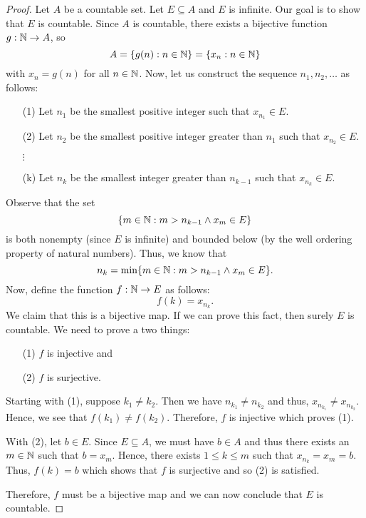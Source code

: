 \documentclass[a4paper]{report}
\begin{document}
\begin{proof}
Let \( A  \) be a countable set. Let \( E \subseteq A  \) and \( E  \) is infinite. Our goal is to show that \( E  \) is countable. Since \( A  \) is countable, there exists a bijective function \( g: \mathbb{N} \to A  \), so 
\[  A = \{ g(n) : n \in \mathbb{N} \} = \{ {x}_{n} : n \in \mathbb{N} \} \]
with \( {x}_{n} = g(n) \) for all \( n \in \mathbb{N} \).
Now, let us construct the sequence \( {n}_{1}, {n}_{2}, \dots  \) as follows: 
\begin{enumerate}
    \item[(1)] Let \( {n}_{1}  \) be the smallest positive integer such that \( {x}_{{n}_{1}} \in E  \). 
    \item[(2)] Let \( {n}_{2} \) be the smallest positive integer greater than \( {n}_{1}  \) such that \( {x}_{{n}_{2}} \in E  \). 
    \item[\( \vdots \)]
    \item[(k)] Let \( {n}_{k} \) be the smallest integer greater than \( {n}_{k - 1}  \) such that \( {x}_{{n}_{k}} \in E  \).
\end{enumerate}
Observe that the set 
\[  \{ m \in \mathbb{N} :  m > {n}_{k-1} \wedge {x}_{m} \in E  \}   \]
is both nonempty (since \( E  \) is infinite) and bounded below (by the well ordering property of natural numbers). Thus, we know that  
\[  {n}_{k} = \min \{ m \in \mathbb{N} : m > {n}_{k-1} \wedge {x}_{m} \in E  \}. \]
Now, define the function \( f: \mathbb{N} \to E  \) as follows:
\[  f(k) = {x}_{{n}_{k}}. \]
We claim that this is a bijective map. If we can prove this fact, then surely \( E  \) is countable. We need to prove a two things:
\begin{enumerate}
    \item[(1)] \( f \) is injective and
    \item[(2)] \( f  \) is surjective.
\end{enumerate}
Starting with (1), suppose \( {k}_{1} \neq {k}_{2}  \). Then we have \( {n}_{{k}_{1}} \neq {n}_{{k}_{2}} \) and thus, \( {x}_{{n}_{{k}_{1}}} \neq {x}_{{n}_{{k}_{2}}} \). Hence, we see that \( f({k}_{1}) \neq f({k}_{2}) \). Therefore, \( f  \) is injective which proves (1).

With (2), let \( b \in E  \). Since \( E \subseteq  A  \), we must have \( b \in A  \) and thus there exists an \( m \in \mathbb{N}  \) such that \( b = {x}_{m} \). Hence, there exists \( 1 \leq k \leq m  \) such that \( {x}_{{n}_{k}} = {x}_{m} = b \). Thus, \( f(k) = b \) which shows that \( f  \) is surjective and so (2) is satisfied.

Therefore, \( f  \) must be a bijective map and we can now conclude that \( E \) is countable.
\end{proof}
\end{document}
